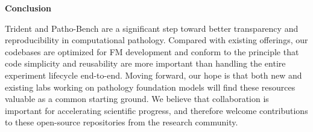 
\noindent\textbf{\Large{Conclusion}} 

Trident and Patho-Bench are a significant step toward better transparency and reproducibility in computational pathology.
Compared with existing offerings, our codebases are optimized for FM development and conform to the principle that code simplicity and reusability are more important than handling the entire experiment lifecycle end-to-end. Moving forward, our hope is that both new and existing labs working on pathology foundation models will find these resources valuable as a common starting ground. We believe that collaboration is important for accelerating scientific progress, and therefore welcome contributions to these open-source repositories from the research community.

